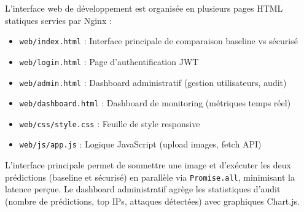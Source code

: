 L'interface web de développement est organisée en plusieurs pages HTML statiques servies par Nginx :

\begin{itemize}
    \item \texttt{web/index.html} : Interface principale de comparaison baseline vs sécurisé
    \item \texttt{web/login.html} : Page d'authentification JWT
    \item \texttt{web/admin.html} : Dashboard administratif (gestion utilisateurs, audit)
    \item \texttt{web/dashboard.html} : Dashboard de monitoring (métriques temps réel)
    \item \texttt{web/css/style.css} : Feuille de style responsive
    \item \texttt{web/js/app.js} : Logique JavaScript (upload images, fetch API)
\end{itemize}

L'interface principale permet de soumettre une image et d'exécuter les deux prédictions (baseline et sécurisé) en parallèle via \texttt{Promise.all}, minimisant la latence perçue. Le dashboard administratif agrège les statistiques d'audit (nombre de prédictions, top IPs, attaques détectées) avec graphiques Chart.js.